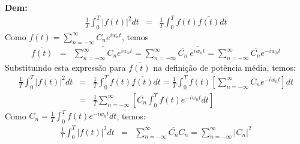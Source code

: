 \documentclass[a4paper,10pt]{book}
\begin{document}
{\bf Dem:}
 \begin{eqnarray*}
  \frac{1}{T}\int_0^T |f(t)|^2dt&=&\frac{1}{T}\int_0^T f(t)\overline{f(t)}dt
 \end{eqnarray*}
  Como $\displaystyle f(t)=\sum_{n=-\infty}^\infty C_n e^{iw_n t}$, temos
  \begin{eqnarray*}
   \overline{f(t)}&=&\overline{\sum_{n=-\infty}^\infty C_n e^{iw_n t}}
   =\sum_{n=-\infty}^\infty \overline{C_n}~ \overline{e^{iw_n t}}
   =\sum_{n=-\infty}^\infty \overline{C_n} e^{-iw_n t}
  \end{eqnarray*}
 Substituindo esta expressão para $\overline{f(t)}$ na definição de potência média, temos:
 \begin{eqnarray*}
  \frac{1}{T}\int_0^T |f(t)|^2dt&=&\frac{1}{T}\int_0^T f(t)\overline{f(t)}dt=\frac{1}{T}\int_0^Tf(t)\left[\sum_{n=-\infty}^\infty \overline{C_n} e^{-iw_n t}\right] dt\\
  &=&\frac{1}{T}\sum_{n=-\infty}^\infty\left[\overline{C_n}\int_0^Tf(t)e^{-iw_nt}dt\right]
  \end{eqnarray*}
  Como $C_n=\frac{1}{T}\int_0^Tf(t)e^{-iw_nt}dt$, temos:
 \begin{eqnarray*}
  \frac{1}{T}\int_0^T |f(t)|^2dt&=&\sum_{n=-\infty}^\infty\overline{C_n}C_n = \sum_{n=-\infty}^\infty|C_n|^2
  \end{eqnarray*}
\end{document}
